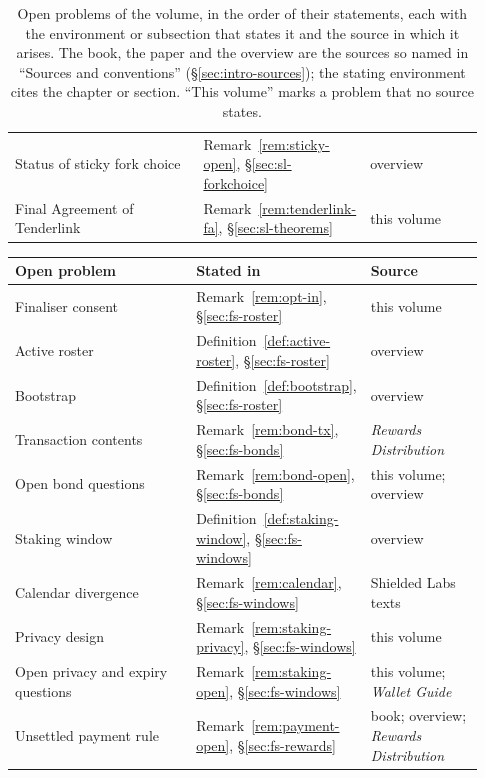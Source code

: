 \documentclass[11pt,a4paper]{article}
\theoremstyle{definition}
\begin{document}
\begin{table}[p]
\begin{tabular}{@{}p{0.42\linewidth}p{0.26\linewidth}p{0.25\linewidth}@{}}
Status of sticky fork choice
  & Remark~\ref{rem:sticky-open}, \S\ref{sec:sl-forkchoice} & overview \\
Final Agreement of Tenderlink
  & Remark~\ref{rem:tenderlink-fa}, \S\ref{sec:sl-theorems} & this volume \\
\bottomrule
\end{tabular}
\caption{Open problems of the volume, in the order of their statements, each
with the environment or subsection that states it and the source in which it
arises. The book, the paper and the overview are the sources so named in
``Sources and conventions'' (\S\ref{sec:intro-sources}); the stating
environment cites the chapter or section. ``This volume'' marks a problem
that no source states.}
\label{tab:open}
\end{table}

\begin{table}[p]
\ContinuedFloat
\centering
\footnotesize \renewcommand{\arraystretch}{1.1}
\begin{tabular}{@{}p{0.42\linewidth}p{0.26\linewidth}p{0.25\linewidth}@{}}
\toprule
Open problem & Stated in & Source \\
\midrule
Finaliser consent
  & Remark~\ref{rem:opt-in}, \S\ref{sec:fs-roster} & this volume \\
Active roster
  & Definition~\ref{def:active-roster}, \S\ref{sec:fs-roster} & overview \\
Bootstrap & Definition~\ref{def:bootstrap}, \S\ref{sec:fs-roster}
  & overview \\
Transaction contents
  & Remark~\ref{rem:bond-tx}, \S\ref{sec:fs-bonds} & \emph{Rewards Distribution}
  \\
Open bond questions
  & Remark~\ref{rem:bond-open}, \S\ref{sec:fs-bonds} & this volume; overview \\
Staking window
  & Definition~\ref{def:staking-window}, \S\ref{sec:fs-windows}
  & overview \\
Calendar divergence
  & Remark~\ref{rem:calendar}, \S\ref{sec:fs-windows}
  & Shielded Labs texts \\
Privacy design
  & Remark~\ref{rem:staking-privacy}, \S\ref{sec:fs-windows} & this volume \\
Open privacy and expiry questions
  & Remark~\ref{rem:staking-open}, \S\ref{sec:fs-windows}
  & this volume; \emph{Wallet Guide} \\
Unsettled payment rule
  & Remark~\ref{rem:payment-open}, \S\ref{sec:fs-rewards}
  & book; overview; \emph{Rewards Distribution} \\

\end{tabular}
\end{table}
\end{document}
